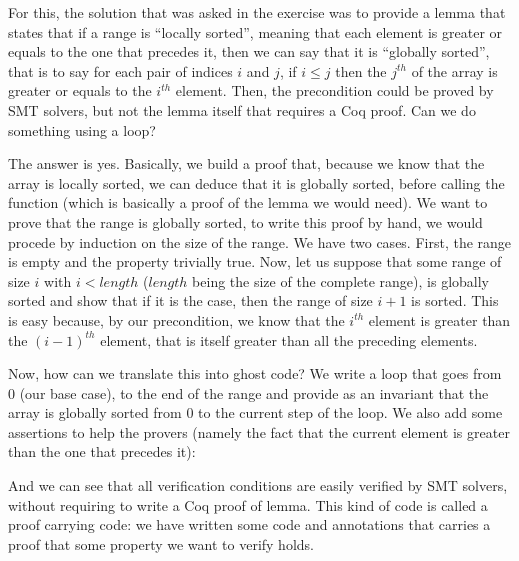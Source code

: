 


For this, the solution that was asked in the exercise was to provide a lemma
that states that if a range is ``locally sorted'', meaning that each element
is greater or equals to the one that precedes it, then we can say that it is
``globally sorted'', that is to say for each pair of indices $i$ and $j$, if
$i \leq j$ then the $j^{th}$ of the array is greater or equals to the $i^{th}$
element. Then, the precondition could be proved by SMT solvers, but not the
lemma itself that requires a Coq proof. Can we do something using a loop?



The answer is yes. Basically, we build a proof that, because we know that the
array is locally sorted, we can deduce that it is globally sorted, before
calling the function (which is basically a proof of the lemma we would need).
We want to prove that the range is globally sorted, to write this proof by hand,
we would procede by induction on the size of the range. We have two cases.
First, the range is empty and the property trivially true. Now, let us suppose
that some range of size $i$ with $i < length$ ($length$ being the size of the
complete range), is globally sorted and show that if it is the case, then the
range of size $i+1$ is sorted. This is easy because, by our precondition, we
know that the $i^{th}$ element is greater than the $(i-1)^{th}$ element, that is
itself greater than all the preceding elements.




Now, how can we translate this into ghost code? We write a loop that goes from
$0$ (our base case), to the end of the range  and provide as an
invariant that the array is globally sorted from $0$ to the current step of the
loop. We also add some assertions to help the provers (namely the fact that the
current element is greater than the one that precedes it):






And we can see that all verification conditions are easily verified by SMT
solvers, without requiring to write a Coq proof of lemma. This kind of code is
called a proof carrying code: we have written some code and annotations that
carries a proof that some property we want to verify holds.



